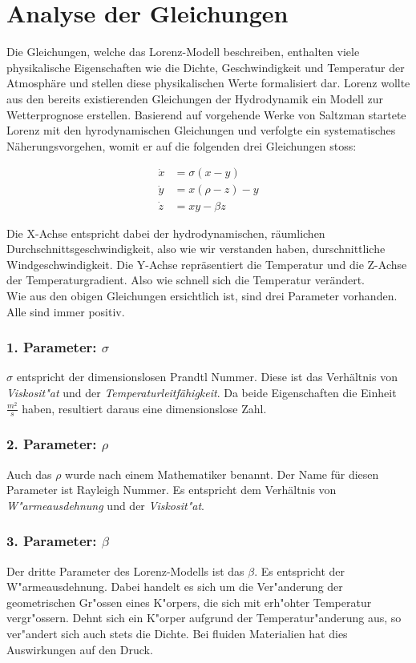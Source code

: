 \documentclass[implementation]{subfiles}
\begin{document}
		\section{Analyse der Gleichungen}
		Die Gleichungen, welche das Lorenz-Modell beschreiben, enthalten viele physikalische Eigenschaften wie die Dichte, Geschwindigkeit und Temperatur der Atmosphäre und stellen diese physikalischen Werte formalisiert dar. Lorenz wollte aus den bereits existierenden Gleichungen der Hydrodynamik ein Modell zur Wetterprognose erstellen. Basierend auf vorgehende Werke von Saltzman startete Lorenz mit den hyrodynamischen Gleichungen und verfolgte ein systematisches Näherungsvorgehen, womit er auf die folgenden drei Gleichungen stoss:
		
		\begin{centerFigure}
			\begin{align}
			\dot{x} &= \sigma(x - y)\\
			\dot{y} &= x(\rho - z) - y\\
			\dot{z} &= xy - \beta z
			\end{align}
		\end{centerFigure}
		
		Die X-Achse entspricht dabei der hydrodynamischen, räumlichen Durchschnittsgeschwindigkeit, also wie wir verstanden haben, durschnittliche Windgeschwindigkeit. 
		Die Y-Achse repräsentiert die Temperatur und die Z-Achse der Temperaturgradient. Also wie schnell sich die Temperatur verändert. \\
		Wie aus den obigen Gleichungen ersichtlich ist, sind drei Parameter vorhanden. Alle sind immer positiv.
		\subsubsection{1. Parameter: $\sigma$}
		$\sigma$ entspricht der dimensionslosen Prandtl Nummer. Diese ist das Verhältnis von \textit{Viskosit"at} und der \textit{Temperaturleitfähigkeit}. Da beide Eigenschaften die Einheit $\frac{m^2}{s}$ haben, resultiert daraus eine dimensionslose Zahl.
		\subsubsection{2. Parameter: $\rho$}
		Auch das $\rho$ wurde nach einem Mathematiker benannt. Der Name für diesen Parameter ist Rayleigh Nummer. Es entspricht dem Verhältnis von \textit{W"armeausdehnung} und der \textit{Viskosit"at}.
		\subsubsection{3. Parameter: $\beta$}
		Der dritte Parameter des Lorenz-Modells ist das $\beta$. Es entspricht der W"armeausdehnung. Dabei handelt es sich um die Ver"anderung der geometrischen Gr"ossen eines K"orpers, die sich mit erh"ohter Temperatur vergr"ossern. Dehnt sich ein K"orper aufgrund der Temperatur"anderung aus, so ver"andert sich auch stets die Dichte. Bei fluiden Materialien hat dies Auswirkungen auf den Druck. 
\end{document}
